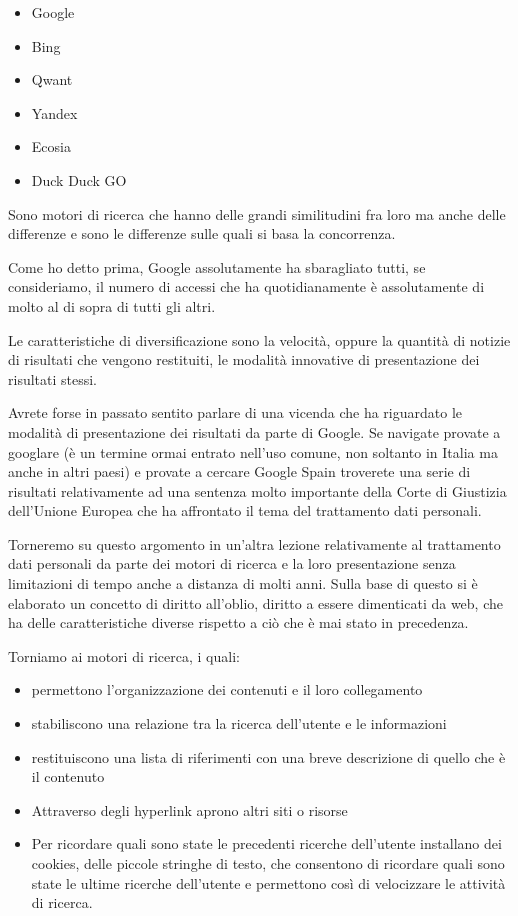 \begin{itemize}
    \item Google
    \item Bing
    \item Qwant
    \item Yandex
    \item Ecosia
    \item Duck Duck GO
\end{itemize}

Sono motori di ricerca che hanno delle grandi similitudini fra loro ma anche delle differenze e sono le differenze sulle quali si basa la concorrenza. 

Come ho detto prima, Google assolutamente ha sbaragliato tutti, se consideriamo, il numero di accessi che ha quotidianamente è assolutamente di molto al di sopra di tutti gli altri.

Le caratteristiche di diversificazione sono la velocità, oppure la quantità di notizie di risultati che vengono restituiti, le modalità innovative di presentazione dei risultati stessi.

Avrete forse in passato sentito parlare di una vicenda che ha riguardato le modalità di presentazione dei risultati da parte di Google. Se navigate provate a googlare (è un termine ormai entrato nell'uso comune, non soltanto in Italia ma anche in altri paesi) e provate a cercare Google Spain troverete una serie di risultati relativamente ad una sentenza molto importante della Corte di Giustizia dell'Unione Europea che ha affrontato il tema del trattamento dati personali.

Torneremo su questo argomento in un'altra lezione relativamente al trattamento dati personali da parte dei motori di ricerca e la loro presentazione senza limitazioni di tempo anche a distanza di molti anni. Sulla base di questo si è elaborato un concetto di diritto all'oblio, diritto a essere dimenticati da web, che ha delle caratteristiche diverse rispetto a ciò che è mai stato in precedenza.

Torniamo ai motori di ricerca, i quali:

\begin{itemize}
    \item permettono l'organizzazione dei contenuti e il loro collegamento
    \item stabiliscono una relazione tra la ricerca dell'utente e le informazioni
    \item restituiscono una lista di riferimenti con una breve descrizione di quello che è il contenuto
    \item Attraverso degli hyperlink aprono altri siti o risorse
    \item Per ricordare quali sono state le precedenti ricerche dell'utente installano dei cookies, delle piccole stringhe di testo, che consentono di ricordare quali sono state le ultime ricerche dell'utente e permettono così di velocizzare le attività di ricerca.
\end{itemize}


